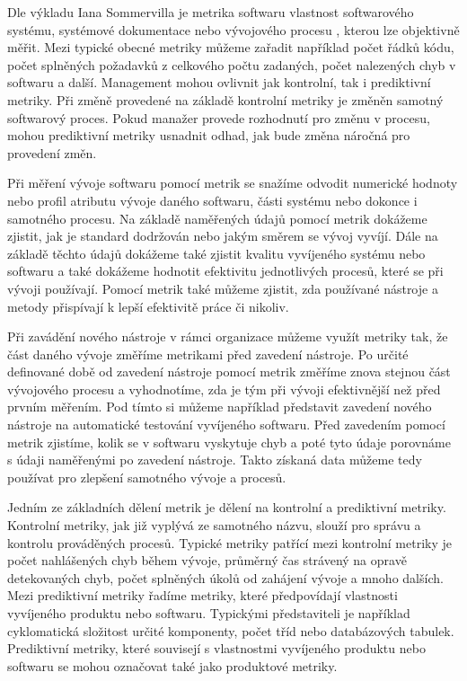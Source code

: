 \documentclass[czech,master,public,dept460,male,cpdeclaration,oneside]{diploma}
\begin{document}
Dle výkladu Iana Sommervilla \cite{ref:metric_definition} je metrika softwaru vlastnost softwarového systému, systémové dokumentace nebo vývojového procesu , kterou lze objektivně měřit. Mezi typické obecné metriky můžeme zařadit například počet řádků kódu, počet splněných požadavků z celkového počtu zadaných, počet nalezených chyb v softwaru a další. Management mohou ovlivnit jak kontrolní, tak i prediktivní metriky. Při změně provedené na základě kontrolní metriky je změněn samotný softwarový proces. Pokud manažer provede rozhodnutí pro změnu v procesu, mohou prediktivní metriky usnadnit odhad, jak bude změna náročná pro provedení změn. 

Při měření vývoje softwaru pomocí metrik se snažíme odvodit numerické hodnoty nebo profil atributu vývoje daného softwaru, části systému nebo dokonce i samotného procesu. Na základě naměřených údajů pomocí metrik dokážeme zjistit, jak je standard dodržován nebo jakým směrem se vývoj vyvíjí. Dále na základě těchto údajů dokážeme také zjistit kvalitu vyvíjeného systému nebo softwaru a také dokážeme hodnotit efektivitu jednotlivých procesů, které se při vývoji používají. Pomocí metrik také můžeme zjistit, zda používané nástroje a metody přispívají k lepší efektivitě práce či nikoliv.

Při zavádění nového nástroje v rámci organizace můžeme využít metriky tak, že část daného vývoje změříme metrikami před zavedení nástroje. Po určité definované době od zavedení nástroje pomocí metrik změříme znova stejnou část vývojového procesu a vyhodnotíme, zda je tým při vývoji efektivnější než před prvním měřením. Pod tímto si můžeme například představit zavedení nového nástroje na automatické testování vyvíjeného softwaru. Před zavedením pomocí metrik zjistíme, kolik se v softwaru vyskytuje chyb a poté tyto údaje porovnáme s údaji naměřenými po zavedení nástroje. Takto získaná data můžeme tedy používat pro zlepšení samotného vývoje a procesů.

Jedním ze základních dělení metrik je dělení na kontrolní a prediktivní metriky. Kontrolní metriky, jak již vyplývá ze samotného názvu, slouží pro správu a kontrolu prováděných procesů. Typické metriky patřící mezi kontrolní metriky je počet nahlášených chyb během vývoje, průměrný čas strávený na opravě detekovaných chyb, počet splněných úkolů od zahájení vývoje a mnoho dalších. Mezi prediktivní metriky řadíme metriky, které předpovídají vlastnosti vyvíjeného produktu nebo softwaru. Typickými představiteli je například cyklomatická složitost určité komponenty, počet tříd nebo databázových tabulek. Prediktivní metriky, které souvisejí s vlastnostmi vyvíjeného produktu nebo softwaru se mohou označovat také jako produktové metriky. \cite{ref:metric_definition} 
\end{document}
